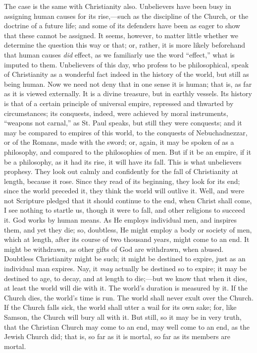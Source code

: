 The case is the same with Christianity also. Unbelievers have been
busy in assigning human causes for its rise,—such as the discipline
of the Church, or the doctrine of a future life; and some of its
defenders have been as eager to show that these cannot be assigned. It
seems, however, to matter little whether we determine the question
this way or that; or, rather, it is more likely beforehand that human
causes \emph{did} effect, as we familiarly use the word
``effect,'' what is imputed to them. Unbelievers of this day,
who profess to be philosophical, speak of Christianity as a wonderful
fact indeed in the history of the world, but still as being human. Now
we need not deny that in one sense it is human; that is, as far as it
is viewed externally. It is a divine treasure, but in earthly vessels.
Its history is that of a certain principle of universal empire,
repressed and thwarted by circumstances; its conquests, indeed, were
achieved by moral instruments, ``weapons not carnal,'' as St.
Paul speaks, but still they were conquests; and it may be compared to
empires of this world, to the conquests of Nebuchadnezzar, or of the
Romans, made with the sword; or, again, it may be spoken of as a
philosophy, and compared to the philosophies of men. But if it be an
empire, if it be a philosophy, as it had its rise, it will have its
fall. This is what unbelievers prophesy. They look out calmly and
confidently for the fall of Christianity at length, because it rose.
Since they read of its beginning, they look for its end; since the
world preceded it, they think the world will outlive it. Well, and
were not Scripture pledged that it should continue to the end, when
Christ shall come, I see nothing to startle us, though it were to
fall, and other religions to succeed it. God works by human means. As
He employs individual men, and inspires them, and yet they die; so,
doubtless, He might employ a body or society of men, which at length,
after its course of two thousand years, might come to an end. It might
be withdrawn, as other gifts of God are withdrawn, when abused.
Doubtless Christianity might be such; it might be destined to expire,
just as an individual man expires. Nay, it \emph{may} actually be
destined so to expire; it may be destined to age, to decay, and at
length to die;—but we know that when it dies, at least the world
will die with it. The world's duration is measured by it. If the
Church dies, the world's time is run. The world shall never exult over
the Church. If the Church falls sick, the world shall utter a wail for
its own sake; for, like Samson, the Church will bury all with it. But
still, so it may be in very truth, that the Christian Church may come
to an end, may well come to an end, as the Jewish Church did; that is,
so far as it is mortal, so far as its members are mortal.

